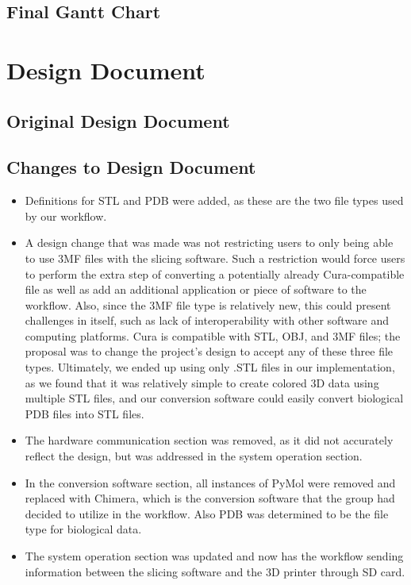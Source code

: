 \documentclass[letterpaper, onecolumn, draftclsnofoot, 10pt, compsoc]{IEEEtran}
\begin{document}
\begin{singlespace}
	\subsection{Final Gantt Chart}
	
	
	\section{Design Document}
	\subsection{Original Design Document}
	
	\subsection{Changes to Design Document} %
	\begin{itemize}
	\item Definitions for STL and PDB were added, as these are the two file types used by our workflow.
	\item A design change that was made was not restricting users to only being able to use 3MF files with the slicing software.
	Such a restriction would force users to perform the extra step of converting a potentially already Cura-compatible file as well as add an additional application or piece of software to the workflow.
	Also, since the 3MF file type is relatively new, this could present challenges in itself, such as lack of interoperability with other software and computing platforms.
	Cura is compatible with STL, OBJ, and 3MF files; the proposal was to change the project's design to accept any of these three file types.
	Ultimately, we ended up using only .STL files in our implementation, as we found that it was relatively simple to create colored 3D data using multiple STL files, and our conversion software could easily convert biological PDB files into STL files.
	\item  The hardware communication section was removed, as it did not accurately reflect the design, but was addressed in the system operation section.
	\item In the conversion software section, all instances of PyMol were removed and replaced with Chimera, which is the conversion software that the group had decided to utilize in the workflow.
	Also PDB was determined to be the file type for biological data.
	\item The system operation section was updated and now has the workflow sending information between the slicing software and the 3D printer through SD card. 
	

\end{itemize}
\end{singlespace}
\end{document}
